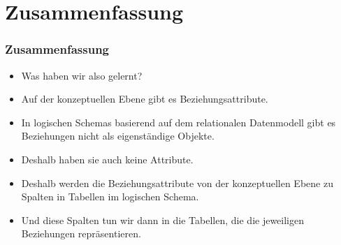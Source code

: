 \documentclass[aspectratio=169,mathserif,notheorems]{beamer}%
\begin{document}
\section{Zusammenfassung}%
%
\begin{frame}%
\frametitle{Zusammenfassung}%
\begin{itemize}%
\item Was haben wir also gelernt?%
%
\item<2-> Auf der konzeptuellen Ebene gibt es Beziehungsattribute.%
%
\item<3-> In logischen Schemas basierend auf dem relationalen Datenmodell gibt es Beziehungen nicht als eigenständige Objekte.%
%
\item<4-> Deshalb haben sie auch keine Attribute.%
%
\item<5-> Deshalb werden die Beziehungsattribute von der konzeptuellen Ebene zu Spalten in Tabellen im logischen Schema.%
%
\item<6-> Und diese Spalten tun wir dann in die Tabellen, die die jeweiligen Beziehungen repräsentieren.%
\end{itemize}%
\end{frame}%
\endPresentation%
\end{document}
